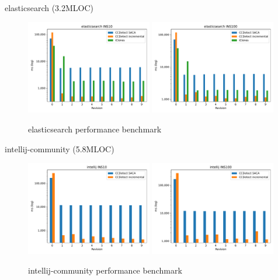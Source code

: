 \documentclass[aspectratio=1610, xcolor=table]{beamer}
\begin{document}
\begin{frame}{elasticsearch (3.2MLOC)}
    \begin{figure}[H]
    \begin{center}
        \includegraphics[width=0.49\textwidth]{figures/performancegraphs/elasticsearch_INS10.pdf} 
        \includegraphics[width=0.49\textwidth]{figures/performancegraphs/elasticsearch_INS100.pdf} \end{center}
    \caption{elasticsearch performance benchmark}
    \label{fig:elasticsearch}
\end{figure}
\end{frame}

\begin{frame}{intellij-community (5.8MLOC)}
    \begin{figure}[H]
    \begin{center}
        \includegraphics[width=0.49\textwidth]{figures/performancegraphs/intellij_INS10.pdf}
        \includegraphics[width=0.49\textwidth]{figures/performancegraphs/intellij_INS100.pdf}
    \end{center}
    \caption{intellij-community performance benchmark}
    \label{fig:intellij}
\end{figure}
\end{frame}
\end{document}
